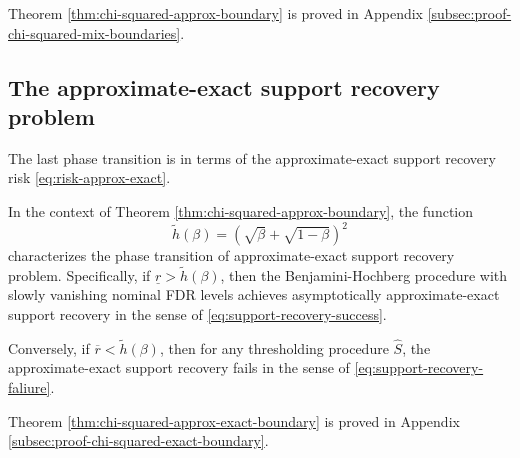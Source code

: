 Theorem \ref{thm:chi-squared-approx-boundary} is proved in Appendix \ref{subsec:proof-chi-squared-mix-boundaries}. 


\subsection{The approximate-exact support recovery problem}
\label{subsec:aprox-exact-support-recovery-boundary}

The last phase transition is in terms of the approximate-exact support recovery risk
\eqref{eq:risk-approx-exact}.

\begin{theorem} \label{thm:chi-squared-approx-exact-boundary}
In the context of Theorem \ref{thm:chi-squared-approx-boundary}, the function 
\begin{equation} \label{eq:approx-exact-boundary-chisquared}
    \widetilde{h}(\beta) = \left(\sqrt{\beta} + \sqrt{1-\beta}\right)^2
\end{equation}
characterizes the phase transition of approximate-exact support recovery problem.
Specifically, if $\underline{r} > \widetilde{h}(\beta)$, then the Benjamini-Hochberg procedure with slowly vanishing nominal FDR levels achieves asymptotically approximate-exact support recovery in the sense of \eqref{eq:support-recovery-success}. 

Conversely, if $\overline{r} < \widetilde{h}(\beta)$, then for any thresholding procedure $\widehat{S}$, the approximate-exact support recovery fails in the sense of \eqref{eq:support-recovery-faliure}.
\end{theorem}

Theorem \ref{thm:chi-squared-approx-exact-boundary} is proved in Appendix \ref{subsec:proof-chi-squared-exact-boundary}. 

